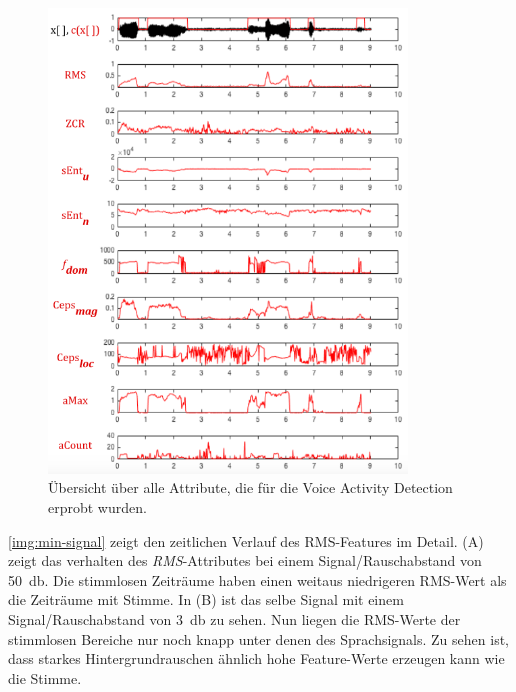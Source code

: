 \begin{figure}[h]
	\centering
	\includegraphics[width=0.85\textwidth]{bilder/allFeatures01.png}
	\caption[Übersicht über alle Attribute, die für die VAD erprobt wurden]{Übersicht über alle Attribute, die für die Voice Activity Detection erprobt wurden.}
	\label{img:vadAllFeatures}
\end{figure}

\autoref{img:min-signal} zeigt den zeitlichen Verlauf des RMS-Features im Detail. (A) zeigt das verhalten des \emph{RMS}-Attributes bei einem Signal/Rauschabstand von \SI{50}{\decibel}. Die stimmlosen Zeiträume haben einen weitaus niedrigeren RMS-Wert als die Zeiträume mit Stimme. In (B) ist das selbe Signal mit einem Signal/Rauschabstand von \SI{3}{\decibel} zu sehen. Nun liegen die RMS-Werte der stimmlosen Bereiche nur noch knapp unter denen des Sprachsignals. Zu sehen ist, dass starkes Hintergrundrauschen ähnlich hohe Feature-Werte erzeugen kann wie die Stimme.

